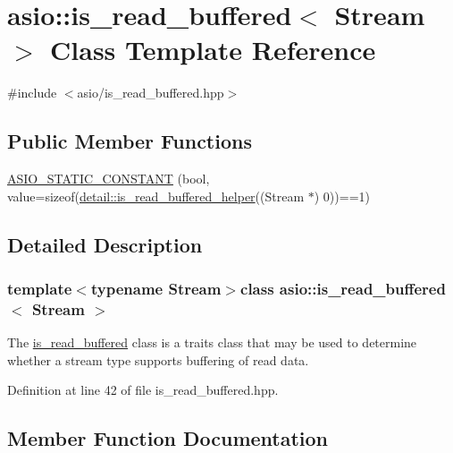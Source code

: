 \hypertarget{classasio_1_1is__read__buffered}{}\section{asio\+:\+:is\+\_\+read\+\_\+buffered$<$ Stream $>$ Class Template Reference}
\label{classasio_1_1is__read__buffered}


{\ttfamily \#include $<$asio/is\+\_\+read\+\_\+buffered.\+hpp$>$}

\subsection*{Public Member Functions}
\begin{DoxyCompactItemize}
\item 
\hyperlink{classasio_1_1is__read__buffered_a4e49db7348f0a0a226a44ea66624496c}{A\+S\+I\+O\+\_\+\+S\+T\+A\+T\+I\+C\+\_\+\+C\+O\+N\+S\+T\+A\+N\+T} (bool, value=sizeof(\hyperlink{namespaceasio_1_1detail_ac51ba8a0b2cbbab69d47430bb1f61b14}{detail\+::is\+\_\+read\+\_\+buffered\+\_\+helper}((Stream $\ast$) 0))==1)
\end{DoxyCompactItemize}


\subsection{Detailed Description}
\subsubsection*{template$<$typename Stream$>$class asio\+::is\+\_\+read\+\_\+buffered$<$ Stream $>$}

The \hyperlink{classasio_1_1is__read__buffered}{is\+\_\+read\+\_\+buffered} class is a traits class that may be used to determine whether a stream type supports buffering of read data. 

Definition at line 42 of file is\+\_\+read\+\_\+buffered.\+hpp.



\subsection{Member Function Documentation}
\hypertarget{classasio_1_1is__read__buffered_a4e49db7348f0a0a226a44ea66624496c}{}
